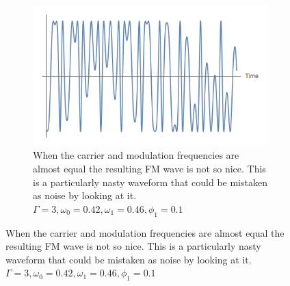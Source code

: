 \documentclass[onecolumn, groupedaddress, 10pt]{revtex4-1}
\begin{document}
\begin{figure}[H]
\begin{subfigure}{.5\textwidth}
  		\centering
  		\includegraphics[width=.9\linewidth]{nastySignal.png}
  		\caption{When the carrier and modulation frequencies are almost equal the resulting FM wave is not so nice.  This is a particularly nasty waveform that could be mistaken as noise by looking at it. $\Gamma = 3, \omega_0 = 0.42, \omega_1 = 0.46, \phi_1 = 0.1$ \label{fig:nastySignal}}
	\end{subfigure}
\end{figure}


\end{document}
